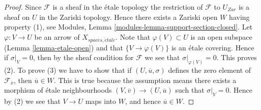 \documentclass[10pt,a4paper]{amsart}
\theoremstyle{plain}
\theoremstyle{definition}
\theoremstyle{remark}
\numberwithin{equation}{subsection}
\def\etale{{\acute{e}tale}}
\begin{document}
\begin{proof}
Since $\mathcal{F}$ is a sheaf in the \'etale topology the restriction of
$\mathcal{F}$ to $U_{Zar}$ is a sheaf on $U$ in the Zariski topology.
Hence there exists a Zariski open $W$ having property (1), see
Modules, Lemma \ref{modules-lemma-support-section-closed}. Let
$\varphi : V \to U$ be an arrow of $X_{spaces, \etale}$. Note that
$\varphi(V) \subset U$ is an open subspace
(Lemma \ref{lemma-etale-open})
and that $\{V \to \varphi(V)\}$ is an \'etale covering. Hence if
$\sigma|_V = 0$, then by the sheaf condition for $\mathcal{F}$ we
see that $\sigma|_{\varphi(V)} = 0$. This proves (2).
To prove (3) we have to show that if $(U, \overline{u}, \sigma)$
defines the zero element of $\mathcal{F}_{\overline{x}}$, then
$\overline{u} \in W$. This is true because the assumption means
there exists a morphism of \'etale neighbourhoods
$(V, \overline{v}) \to (U, \overline{u})$ such that
$\sigma|_V = 0$. Hence by (2) we see that $V \to U$ maps into $W$, and
hence $\overline{u} \in W$.
\end{proof}
\end{document}
